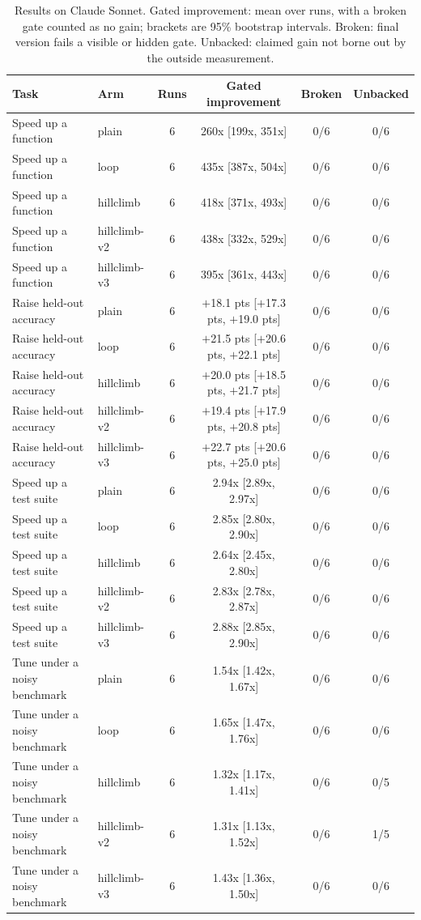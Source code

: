 \begin{table}[t]\centering\small\setlength{\tabcolsep}{3pt}
\caption{Results on Claude Sonnet. Gated improvement: mean over runs, with a broken gate counted as no gain; brackets are 95\% bootstrap intervals. Broken: final version fails a visible or hidden gate. Unbacked: claimed gain not borne out by the outside measurement.}
\label{tab:sonnet}
\begin{tabular}{llcccc}\toprule
Task & Arm & Runs & Gated improvement & Broken & Unbacked \\\midrule
Speed up a function & plain & 6 & 260x [199x, 351x] & 0/6 & 0/6 \\
Speed up a function & loop & 6 & 435x [387x, 504x] & 0/6 & 0/6 \\
Speed up a function & hillclimb & 6 & 418x [371x, 493x] & 0/6 & 0/6 \\
Speed up a function & hillclimb-v2 & 6 & 438x [332x, 529x] & 0/6 & 0/6 \\
Speed up a function & hillclimb-v3 & 6 & 395x [361x, 443x] & 0/6 & 0/6 \\
\midrule
Raise held-out accuracy & plain & 6 & $+$18.1 pts [$+$17.3 pts, $+$19.0 pts] & 0/6 & 0/6 \\
Raise held-out accuracy & loop & 6 & $+$21.5 pts [$+$20.6 pts, $+$22.1 pts] & 0/6 & 0/6 \\
Raise held-out accuracy & hillclimb & 6 & $+$20.0 pts [$+$18.5 pts, $+$21.7 pts] & 0/6 & 0/6 \\
Raise held-out accuracy & hillclimb-v2 & 6 & $+$19.4 pts [$+$17.9 pts, $+$20.8 pts] & 0/6 & 0/6 \\
Raise held-out accuracy & hillclimb-v3 & 6 & $+$22.7 pts [$+$20.6 pts, $+$25.0 pts] & 0/6 & 0/6 \\
\midrule
Speed up a test suite & plain & 6 & 2.94x [2.89x, 2.97x] & 0/6 & 0/6 \\
Speed up a test suite & loop & 6 & 2.85x [2.80x, 2.90x] & 0/6 & 0/6 \\
Speed up a test suite & hillclimb & 6 & 2.64x [2.45x, 2.80x] & 0/6 & 0/6 \\
Speed up a test suite & hillclimb-v2 & 6 & 2.83x [2.78x, 2.87x] & 0/6 & 0/6 \\
Speed up a test suite & hillclimb-v3 & 6 & 2.88x [2.85x, 2.90x] & 0/6 & 0/6 \\
\midrule
Tune under a noisy benchmark & plain & 6 & 1.54x [1.42x, 1.67x] & 0/6 & 0/6 \\
Tune under a noisy benchmark & loop & 6 & 1.65x [1.47x, 1.76x] & 0/6 & 0/6 \\
Tune under a noisy benchmark & hillclimb & 6 & 1.32x [1.17x, 1.41x] & 0/6 & 0/5 \\
Tune under a noisy benchmark & hillclimb-v2 & 6 & 1.31x [1.13x, 1.52x] & 0/6 & 1/5 \\
Tune under a noisy benchmark & hillclimb-v3 & 6 & 1.43x [1.36x, 1.50x] & 0/6 & 0/6 \\
\bottomrule\end{tabular}\end{table}
